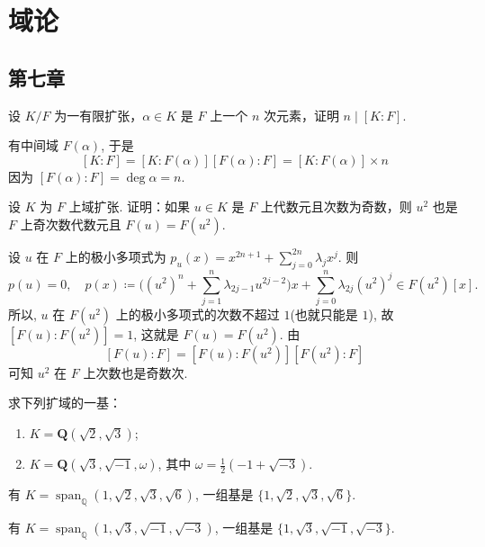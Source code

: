 \section{域论}
\subsection{第七章}

\setcounter{pb}{2}
\begin{problem}
    设 $ K/F $ 为一有限扩张，$ \alpha \in K $ 是 $ F $ 上一个 $ n $ 次元素，证明 $ n \mid [K : F] $.
\end{problem}

\begin{solution}
    有中间域 $F(\alpha) $, 于是 
        \[
            [K:F]=[K:F(\alpha)][F(\alpha):F]=[K:F(\alpha)]\times n
        \]
    因为 $[F(\alpha):F]=\deg\alpha=n$.
\end{solution}

\setcounter{pb}{4}
\begin{problem}
    设 $ K $ 为 $ F $ 上域扩张. 证明：如果 $ u \in K $ 是 $ F $ 上代数元且次数为奇数，则 $ u^2 $ 也是 $ F $ 上奇次数代数元且 $ F(u) = F(u^2) $.
\end{problem}

\begin{solution}
    设 $u$ 在 $F$ 上的极小多项式为 $p_{u}(x)=x^{2n+1}+\sum_{j=0}^{2n}\lambda_{j}x^{j}$. 
    则 
        \[
            p(u)=0,\quad p(x)\coloneqq \Big((u^{2})^{n}+\sum_{j=1}^{n}\lambda_{2j-1}u^{2j-2}\Big)x+\sum_{j=0}^{n}\lambda_{2j}(u^{2})^{j}\in F(u^{2})[x].
        \]
    所以, $u$ 在 $F(u^{2})$ 上的极小多项式的次数不超过 $1$(也就只能是 $1$), 故 $[F(u):F(u^{2})]=1$, 这就是 $F(u)=F(u^{2})$. 由 
        \[
            [F(u):F]=[F(u):F(u^{2})] [F(u^{2}):F]
        \]
    可知 $u^{2}$ 在 $F$ 上次数也是奇数次.
\end{solution}

\setcounter{pb}{6}
\begin{problem}
    求下列扩域的一基：
    \begin{enumerate}[label=(\roman*)]
        \item $ K = \mathbf{Q}(\sqrt{2}, \sqrt{3}) $;
        \item $ K = \mathbf{Q}(\sqrt{3}, \sqrt{-1}, \omega) $, 其中 $ \omega = \frac{1}{2}(-1 + \sqrt{-3}) $.
    \end{enumerate}
\end{problem}

\begin{solution}
    有 $K=\operatorname{span}_{\mathbb{Q}}(1,\sqrt{2},\sqrt{3},\sqrt{6})$, 一组基是 $\{1,\sqrt{2},\sqrt{3},\sqrt{6}\}$.
    \par 有 $K=\operatorname{span}_{\mathbb{Q}}(1,\sqrt{3},\sqrt{-1},\sqrt{-3})$, 一组基是 $\{1,\sqrt{3},\sqrt{-1},\sqrt{-3}\}$.
\end{solution}

